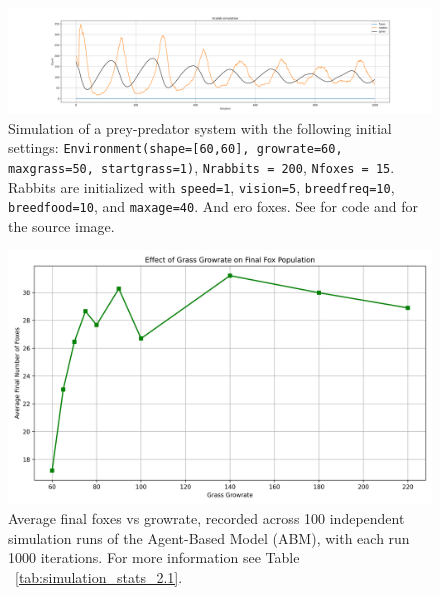 \begin{figure}[!ht]
  \centering
  \includegraphics[width=0.9\linewidth]{images/Ecolab_simulation_no_foxes.png}
  \caption{Simulation of a prey-predator system with the following initial settings: \texttt{Environment(shape=[60,60], growrate=60, maxgrass=50, startgrass=1)}, \texttt{Nrabbits = 200}, \texttt{Nfoxes = 15}. Rabbits are initialized with \texttt{speed=1}, \texttt{vision=5}, \texttt{breedfreq=10}, \texttt{breedfood=10}, and \texttt{maxage=40}. And ero foxes. See \cite{youngaryantwo_initial_conditions_3d_separateICode} for code and \cite{youngaryantwo_initial_conditions_3d_3separateICode} for the source image.}
  \label{fig:Ecolab_pred_prey_no_foxes}
\end{figure}


\begin{figure}[!ht]
  \centering
  \includegraphics[width=0.9\linewidth]{images/avg_final_foxes_vs_growrate_100.png}
  \caption{
    Average final foxes vs growrate, recorded across 100 independent simulation runs of the Agent-Based Model (ABM), with each run 1000 iterations. For more information see Table ~\ref{tab:simulation_stats_2.1}.
}
  \label{fig:avg_final_foxes_vs_growrate_100_2.1}
\end{figure}



